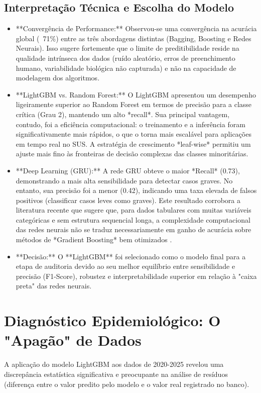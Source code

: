 \documentclass[12pt, a4paper]{report}
\begin{document}
\subsection{Interpretação Técnica e Escolha do Modelo}
\begin{itemize}
    \item **Convergência de Performance:** Observou-se uma convergência na acurácia global (~71\%) entre as três abordagens distintas (Bagging, Boosting e Redes Neurais). Isso sugere fortemente que o limite de preditibilidade reside na qualidade intrínseca dos dados (ruído aleatório, erros de preenchimento humano, variabilidade biológica não capturada) e não na capacidade de modelagem dos algoritmos.
    \item **LightGBM vs. Random Forest:** O LightGBM apresentou um desempenho ligeiramente superior ao Random Forest em termos de precisão para a classe crítica (Grau 2), mantendo um alto *recall*. Sua principal vantagem, contudo, foi a eficiência computacional: o treinamento e a inferência foram significativamente mais rápidos, o que o torna mais escalável para aplicações em tempo real no SUS. A estratégia de crescimento *leaf-wise* permitiu um ajuste mais fino às fronteiras de decisão complexas das classes minoritárias.
    \item **Deep Learning (GRU):** A rede GRU obteve o maior *Recall* (0.73), demonstrando a mais alta sensibilidade para detectar casos graves. No entanto, sua precisão foi a menor (0.42), indicando uma taxa elevada de falsos positivos (classificar casos leves como graves). Este resultado corrobora a literatura recente que sugere que, para dados tabulares com muitas variáveis categóricas e sem estrutura sequencial longa, a complexidade computacional das redes neurais não se traduz necessariamente em ganho de acurácia sobre métodos de *Gradient Boosting* bem otimizados \citep{shwartz2022tabular}.
    \item **Decisão:** O **LightGBM** foi selecionado como o modelo final para a etapa de auditoria devido ao seu melhor equilíbrio entre sensibilidade e precisão (F1-Score), robustez e interpretabilidade superior em relação à "caixa preta" das redes neurais.
\end{itemize}



\section{Diagnóstico Epidemiológico: O "Apagão" de Dados}
A aplicação do modelo LightGBM aos dados de 2020-2025 revelou uma discrepância estatística significativa e preocupante na análise de resíduos (diferença entre o valor predito pelo modelo e o valor real registrado no banco).
\end{document}
